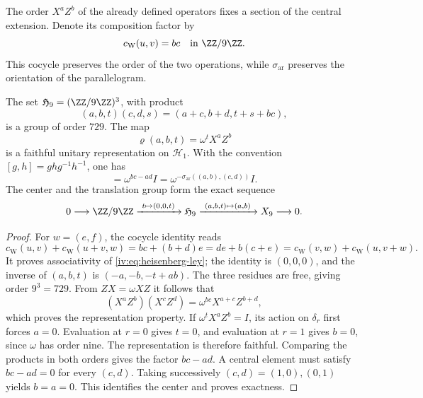 The order \(X^aZ^b\) of the already defined operators fixes a section
of the central extension. Denote its composition factor by
\begin{equation}
 c_{\mathrm W}(u,v)=bc\quad\text{in }\ZZ/9\ZZ.
 \label{iv:eq:weyl-cociclo-polarizado}
\end{equation}
This cocycle preserves the order of the two operations, while
\(\sigma_{\mathrm{ar}}\) preserves the orientation of the parallelogram.

\begin{proposition}
\label{iv:prop:heisenberg-orientado}
The set \(\mathfrak H_9=(\ZZ/9\ZZ)^3\), with product
\begin{equation}
 (a,b,t)(c,d,s)=(a+c,b+d,t+s+bc),
 \label{iv:eq:heisenberg-ley}
\end{equation}
is a group of order \(729\). The map
\[
 \varrho(a,b,t)=\omega^tX^aZ^b
\]
is a faithful unitary representation on \(\mathcal H_1\).
With the convention \([g,h]=ghg^{-1}h^{-1}\), one has
\begin{equation}
 [\varrho(a,b,0),\varrho(c,d,0)]
 =\omega^{bc-ad}I
 =\omega^{-\sigma_{\mathrm{ar}}((a,b),(c,d))}I.
 \label{iv:eq:weyl-conmutador-orientado}
\end{equation}
The center and the translation group form the exact sequence
\[
 0\longrightarrow\ZZ/9\ZZ
 \xrightarrow{\ t\mapsto(0,0,t)\ }\mathfrak H_9
 \xrightarrow{\ (a,b,t)\mapsto(a,b)\ }X_9
 \longrightarrow0.
\]
\end{proposition}
\begin{proof}
For \(w=(e,f)\), the cocycle identity reads
\[
 c_{\mathrm W}(u,v)+c_{\mathrm W}(u+v,w)
 =bc+(b+d)e
 =de+b(c+e)
 =c_{\mathrm W}(v,w)+c_{\mathrm W}(u,v+w).
\]
It proves associativity of \eqref{iv:eq:heisenberg-ley}; the identity
is \((0,0,0)\), and the inverse of \((a,b,t)\) is
\((-a,-b,-t+ab)\). The three residues are free, giving order
\(9^3=729\). From \(ZX=\omega XZ\) it follows that
\[
 (X^aZ^b)(X^cZ^d)=\omega^{bc}X^{a+c}Z^{b+d},
\]
which proves the representation property. If
\(\omega^tX^aZ^b=I\), its action on \(\delta_r\) first forces
\(a=0\). Evaluation at \(r=0\) gives \(t=0\), and
evaluation at \(r=1\) gives \(b=0\), since \(\omega\) has order
nine. The representation is therefore faithful. Comparing the
products in both orders gives the factor \(bc-ad\).
A central element must satisfy \(bc-ad=0\) for every \((c,d)\).
Taking successively \((c,d)=(1,0),(0,1)\) yields
\(b=a=0\). This identifies the center and proves exactness.
\end{proof}

